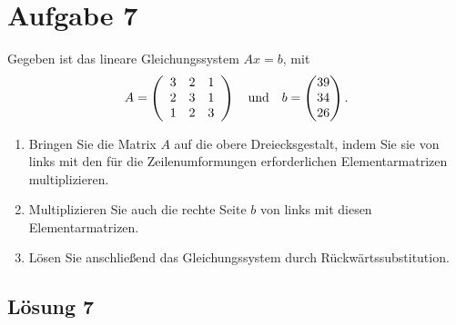 \documentclass[main.tex]{subfiles}
\begin{document}
\section{Aufgabe 7}
Gegeben ist das lineare Gleichungssystem $Ax=b$, mit
$$
    A = \eqmatrix{ccc}{
        3 & 2 & 1 \\
        2 & 3 & 1 \\
        1 & 2 & 3
    } \quad \text{und} \quad
    b=\vektor{39\\ 34\\ 26}.
$$

\begin{enumerate}
    \item Bringen Sie die Matrix $A$ auf die obere Dreiecksgestalt, indem Sie sie von links mit den für die Zeilenumformungen erforderlichen Elementarmatrizen multiplizieren.
    \item Multiplizieren Sie auch die rechte Seite $b$ von links mit diesen Elementarmatrizen.
    \item Lösen Sie anschließend das Gleichungssystem durch Rückwärtssubstitution.
\end{enumerate}

\subsection{Lösung 7}

\end{document}
